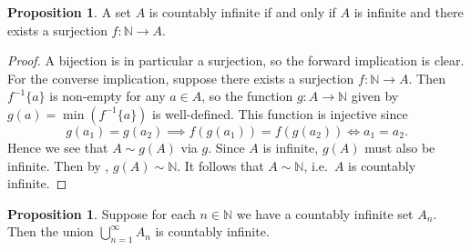 \documentclass[12pt]{article}
\theoremstyle{definition}
\newtheorem{proposition}[definition]{Proposition}
\begin{document}
\begin{proposition}
\label{prop:countable_iff_surjection_from_N}
    A set \( A \) is countably infinite if and only if \( A \) is infinite and there exists a surjection \( f : \mathbb{N} \to A \).
\end{proposition}

\begin{proof}
    A bijection is in particular a surjection, so the forward implication is clear. For the converse implication, suppose there exists a surjection \( f : \mathbb{N} \to A \). Then \( f^{-1} \{ a \} \) is non-empty for any \( a \in A \), so the function \( g : A \to \mathbb{N} \) given by \( g(a) = \min( f^{-1} \{ a \} ) \) is well-defined. This function is injective since
    \[
        g(a_1) = g(a_2) \implies f(g(a_1)) = f(g(a_2)) \iff a_1 = a_2.
    \]
    Hence we see that \( A \sim g(A) \) via \( g \). Since \( A \) is infinite, \( g(A) \) must also be infinite. Then by , \( g(A) \sim \mathbb{N} \). It follows that \( A \sim \mathbb{N} \), i.e.\ \( A \) is countably infinite.
\end{proof}

\begin{proposition}
\label{prop:countable_union_of_countable_sets_is_countable}
    Suppose for each \( n \in \mathbb{N} \) we have a countably infinite set \( A_n \). Then the union \( \bigcup_{n=1}^{\infty} A_n \) is countably infinite.
\end{proposition}
\end{document}
